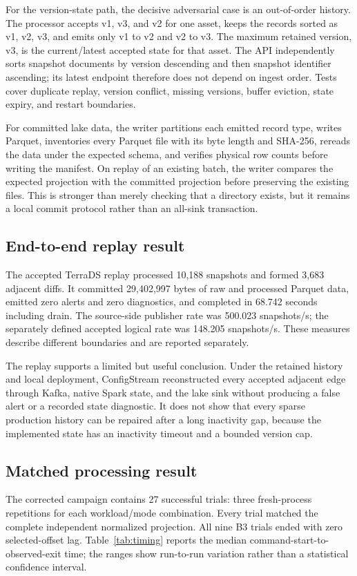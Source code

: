 \documentclass[a4paper,11pt]{article}
\begin{document}
For the version-state path, the decisive adversarial case is an out-of-order history. The processor accepts v1, v3, and v2 for one asset, keeps the records sorted as v1, v2, v3, and emits only v1 to v2 and v2 to v3. The maximum retained version, v3, is the current/latest accepted state for that asset. The API independently sorts snapshot documents by version descending and then snapshot identifier ascending; its latest endpoint therefore does not depend on ingest order. Tests cover duplicate replay, version conflict, missing versions, buffer eviction, state expiry, and restart boundaries.

For committed lake data, the writer partitions each emitted record type, writes Parquet, inventories every Parquet file with its byte length and SHA-256, rereads the data under the expected schema, and verifies physical row counts before writing the manifest. On replay of an existing batch, the writer compares the expected projection with the committed projection before preserving the existing files. This is stronger than merely checking that a directory exists, but it remains a local commit protocol rather than an all-sink transaction.

\subsection{End-to-end replay result}
The accepted TerraDS replay processed 10,188 snapshots and formed 3,683 adjacent diffs. It committed 29,402,997 bytes of raw and processed Parquet data, emitted zero alerts and zero diagnostics, and completed in 68.742 seconds including drain. The source-side publisher rate was 500.023 snapshots/s; the separately defined accepted logical rate was 148.205 snapshots/s. These measures describe different boundaries and are reported separately.

The replay supports a limited but useful conclusion. Under the retained history and local deployment, ConfigStream reconstructed every accepted adjacent edge through Kafka, native Spark state, and the lake sink without producing a false alert or a recorded state diagnostic. It does not show that every sparse production history can be repaired after a long inactivity gap, because the implemented state has an inactivity timeout and a bounded version cap.

\subsection{Matched processing result}
The corrected campaign contains 27 successful trials: three fresh-process repetitions for each workload/mode combination. Every trial matched the complete independent normalized projection. All nine B3 trials ended with zero selected-offset lag. Table~\ref{tab:timing} reports the median command-start-to-observed-exit time; the ranges show run-to-run variation rather than a statistical confidence interval.
\end{document}
